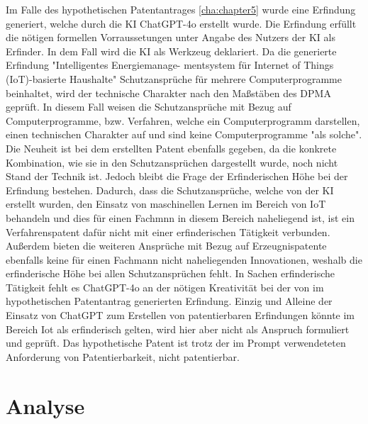 Im Falle des hypothetischen Patentantrages \ref{cha:chapter5}
wurde eine Erfindung generiert, welche durch die KI ChatGPT-4o
erstellt wurde.
Die Erfindung erfüllt die nötigen formellen Vorraussetungen
unter Angabe des Nutzers der KI als Erfinder. In dem Fall
wird die KI als Werkzeug deklariert.
Da die generierte Erfindung "Intelligentes Energiemanage-
mentsystem für Internet of Things (IoT)-basierte Haushalte"
Schutzansprüche für mehrere Computerprogramme beinhaltet, 
wird der technische Charakter nach den Maßstäben des DPMA geprüft.
In diesem Fall weisen die Schutzansprüche mit 
Bezug auf Computerprogramme, bzw. Verfahren,
welche ein Computerprogramm darstellen, 
einen technischen Charakter auf und
sind keine Computerprogramme "als solche".
Die Neuheit ist bei dem erstellten Patent ebenfalls gegeben,
da die konkrete Kombination, wie sie in den Schutzansprüchen
dargestellt wurde, noch nicht Stand der Technik ist.
Jedoch bleibt die Frage der Erfinderischen Höhe bei der
Erfindung bestehen.
Dadurch, dass die Schutzansprüche, welche von der KI
erstellt wurden, den Einsatz von maschinellen
Lernen im Bereich von IoT behandeln und dies
für einen Fachmnn in diesem Bereich naheliegend
ist, ist ein Verfahrenspatent dafür nicht mit einer
erfinderischen Tätigkeit verbunden.
Außerdem bieten die weiteren Ansprüche mit Bezug auf 
Erzeugnispatente ebenfalls keine
für einen Fachmann nicht naheliegenden Innovationen,
weshalb die erfinderische Höhe bei allen Schutzansprüchen fehlt.
In Sachen erfinderische Tätigkeit 
fehlt es ChatGPT-4o an der nötigen Kreativität bei 
der von im hypothetischen Patentantrag generierten Erfindung.
Einzig und Alleine der Einsatz von ChatGPT zum Erstellen
von patentierbaren Erfindungen könnte im Bereich Iot 
als erfinderisch gelten, wird hier aber nicht als Anspruch
formuliert und geprüft.
Das hypothetische Patent ist trotz der im Prompt 
verwendeteten Anforderung von Patentierbarkeit,
nicht patentierbar. 
\section{Analyse}

